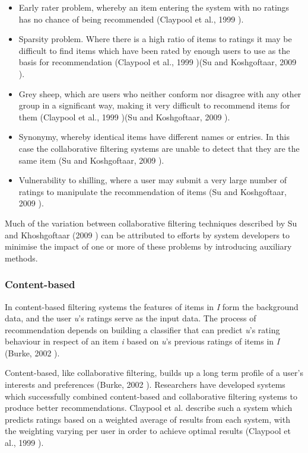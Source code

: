 \begin{itemize}
    \item Early rater problem, whereby an item entering the system with no ratings has no chance of being recommended (Claypool et al., 1999 \cite{Claypool99}).
    \item Sparsity problem. Where there is a high ratio of items to ratings it may be difficult to find items which have been rated by enough users to use as the basis for recommendation (Claypool et al., 1999 \cite{Claypool99})(Su and Koshgoftaar, 2009 \cite{Su09}).
    \item Grey sheep, which are users who neither conform nor disagree with any other group in a significant way, making it very difficult to recommend items for them (Claypool et al., 1999 \cite{Claypool99})(Su and Koshgoftaar, 2009 \cite{Su09}).
    \item Synonymy, whereby identical items have different names or entries. In this case the collaborative filtering systems are unable to detect that they are the same item (Su and Koshgoftaar, 2009 \cite{Su09}).
    \item Vulnerability to shilling, where a user may submit a very large number of ratings to manipulate the recommendation of items (Su and Koshgoftaar, 2009 \cite{Su09}).
\end{itemize}

Much of the variation between collaborative filtering techniques described by Su and Khoshgoftaar (2009 \cite{Su09}) can be attributed to efforts by system developers to minimise the impact of one or more of these problems by introducing auxiliary methods.

\subsubsection{Content-based}

In content-based filtering systems the features of items in \textit{I} form the background data, and the user \textit{u}'s ratings serve as the input data. The process of recommendation depends on building a classifier that can predict \textit{u}'s rating behaviour in respect of an item \textit{i} based on \textit{u}'s previous ratings of items in \textit{I} (Burke, 2002 \cite{Burke02}).

Content-based, like collaborative filtering, builds up a long term profile of a user's interests and preferences (Burke, 2002 \cite{Burke02}). Researchers have developed systems which successfully combined content-based and collaborative filtering systems to produce better recommendations. Claypool et al. describe such a system which predicts ratings based on a weighted average of results from each system, with the weighting varying per user in order to achieve optimal results (Claypool et al., 1999 \cite{Claypool99}).

